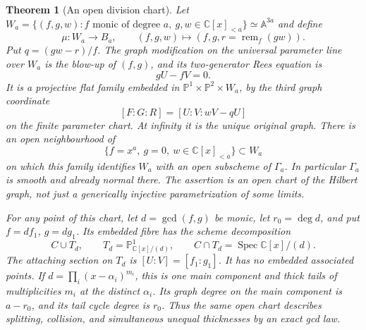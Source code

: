 \documentclass[11pt,reqno]{amsart}
\numberwithin{equation}{section}
\newtheorem{theorem}{Theorem}[section]
\theoremstyle{definition}\newtheorem{definition}[theorem]{Definition}
\theoremstyle{remark}\newtheorem{remark}[theorem]{Remark}
\newcommand{\C}{\mathbb C}\newcommand{\Q}{\mathbb Q}
\newcommand{\Pj}{\mathbb P}\newcommand{\A}{\mathbb A}
\DeclareMathOperator{\Spec}{Spec}\DeclareMathOperator{\PGL}{PGL}
\begin{document}
\begin{theorem}[An open division chart]
\label{thm:division-chart-v162}
Let $W_a=\{(f,g,w): f\text{ monic of degree }a,
                   \ g,w\in\C[x]_{<a}\}\simeq\A^{3a}$ and define
\begin{equation}\label{eq:division-map-v162}
 \mu:W_a\longrightarrow B_a,
       \qquad (f,g,w)\longmapsto(f,g,r=\operatorname{rem}_f(gw)).
\end{equation}
Put $q=(gw-r)/f$. The graph modification on the universal parameter
line over $W_a$ is the blow-up of $(f,g)$, and its two-generator
Rees equation is
\begin{equation}\label{eq:division-Rees-v162}
                  gU-fV=0.
\end{equation}
It is a projective flat family embedded in
$\Pj^1\times\Pj^2\times W_a$, by the third graph coordinate
\begin{equation}\label{eq:third-coordinate-v162}
                  [F:G:R]=[U:V:wV-qU]
\end{equation}
on the finite parameter chart. At infinity it is the unique original
graph. There is an open neighbourhood of
\[
         \{f=x^a,\ g=0,\ w\in\C[x]_{<a}\}\subset W_a
\]
on which this family identifies $W_a$ with an open subscheme of
$\Gamma_a$. In particular $\Gamma_a$ is smooth and already normal
there. The assertion is an open chart of the Hilbert graph, not just
a generically injective parametrization of some limits.

For any point of this chart, let $d=\gcd(f,g)$ be monic, let
$r_0=\deg d$, and put $f=df_1$, $g=dg_1$. Its embedded fibre has
the scheme decomposition
\begin{equation}\label{eq:gcd-fibre-v162}
 C\cup T_d,\qquad T_d=\Pj^1_{\C[x]/(d)},\qquad
 C\cap T_d=\Spec\C[x]/(d).
\end{equation}
The attaching section on $T_d$ is $[U:V]=[f_1:g_1]$.
It has no embedded associated points. If
$d=\prod_i(x-\alpha_i)^{m_i}$, this is one main component and
thick tails of multiplicities $m_i$ at the distinct $\alpha_i$.
Its graph degree on the main component is $a-r_0$, and its tail
cycle degree is $r_0$. Thus the same open chart describes splitting,
collision, and simultaneous unequal thicknesses by an exact gcd law.
\end{theorem}
\end{document}
